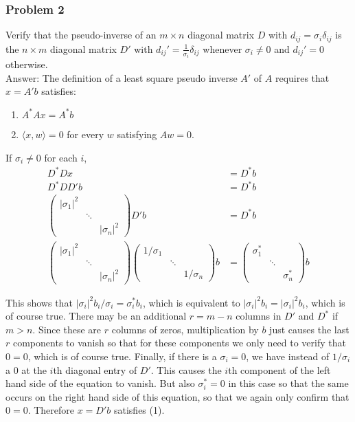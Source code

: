 \documentclass{article}
\begin{document}
\subsubsection*{Problem 2}

Verify that the pseudo-inverse of an $m \times n$ diagonal matrix $D$ with $d_{ij} = \sigma_i \delta_{ij}$ is the $n \times m$ diagonal matrix $D'$ with $d_{ij}' = \frac{1}{\sigma_i}\delta_{ij}$ whenever $\sigma_i \neq 0$ and $d_{ij}' = 0$ otherwise. \\

Answer: The definition of a least square pseudo inverse $A'$ of $A$ requires that $x = A'b$ satisfies:

\begin{enumerate}
\item $A^*Ax = A^*b$ 

\item $\langle x , w \rangle = 0$ for every $w$ satisfying  $Aw = 0$. 
\end{enumerate}

If $\sigma_i \neq 0$ for each $i$, 
\begin{align*}
D^*Dx &= D^* b \\
D^*DD'b &= D^* b \\
\begin{pmatrix}
|\sigma_1|^2 & & \\
& \ddots & \\
& & |\sigma_n|^2
\end{pmatrix}
D'b &= D^*b \\
\begin{pmatrix}
|\sigma_1|^2 & & \\
& \ddots & \\
& & |\sigma_n|^2
\end{pmatrix}
\begin{pmatrix}
1/\sigma_1 & & \\ & \ddots & \\ & & 1/\sigma_n
\end{pmatrix}b &= \begin{pmatrix}
\sigma_1^* & & \\ & \ddots & \\ & & \sigma_n^*
\end{pmatrix} b
\end{align*}

This shows that $|\sigma_i|^2 b_i / \sigma_i = \sigma_i^* b_i$, which is equivalent to $|\sigma_i|^2 b_i = |\sigma_i|^2 b_i$, which is of course true. There may be an additional $r = m-n$ columns in $D'$ and $D^*$ if $m > n$. Since these are $r$ columns of zeros, multiplication by $b$ just causes the last $r$ components to vanish so that for these components we only need to verify that $0 = 0$, which is of course true. Finally, if there is a $\sigma_i = 0$, we have instead of $1/\sigma_i$ a 0 at the $i$th diagonal entry of $D'$. This causes the $i$th component of the left hand side of the equation to vanish. But also $\sigma_i^* = 0$ in this case so that the same occurs on the right hand side of this equation, so that we again only confirm that $0 = 0$. Therefore $x = D'b$ satisfies (1). \\
\end{document}
